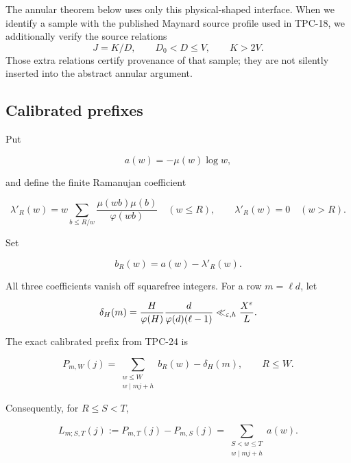 The annular theorem below uses only this physical-shaped interface.
When we identify a sample with the published Maynard source profile
used in TPC-18, we additionally verify the source relations
\[
 J=K/D,\qquad D_0<D\le V,\qquad K>2V.
\]
Those extra relations certify provenance of that sample; they are not
silently inserted into the abstract annular argument.

\subsection{Calibrated prefixes}

Put

\begin{equation}
 a(w)=-\mu(w)\log w,
 \label{eq:tpc26-a}
\end{equation}

and define the finite Ramanujan coefficient

\begin{equation}
 \lambda'_R(w)
 =w\sum_{b\le R/w}\frac{\mu(wb)\mu(b)}{\varphi(wb)}
 \quad(w\le R),
 \qquad
 \lambda'_R(w)=0\quad(w>R).
 \label{eq:tpc26-lambda-prime}
\end{equation}

Set

\begin{equation}
 b_R(w)=a(w)-\lambda'_R(w).
 \label{eq:tpc26-bR}
\end{equation}

All three coefficients vanish off squarefree integers.  For a row
\(m=\ell d\), let

\begin{equation}
 \delta_H(m)
 =\frac{H}{\varphi(H)}
 \frac{d}{\varphi(d)(\ell-1)}
 \ll_{\varepsilon,h}\frac{X^\varepsilon}{L}.
 \label{eq:tpc26-drift}
\end{equation}

The exact calibrated prefix from TPC-24 is

\begin{equation}
 P_{m,W}(j)
 =
 \sum_{\substack{w\le W\\w\mid mj+h}}b_R(w)-\delta_H(m),
 \qquad R\le W.
 \label{eq:tpc26-prefix}
\end{equation}

Consequently, for \(R\le S<T\),

\begin{equation}
 L_{m;S,T}(j)
 :=P_{m,T}(j)-P_{m,S}(j)
 =\sum_{\substack{S<w\le T\\w\mid mj+h}}a(w).
 \label{eq:tpc26-long-shell}
\end{equation}

